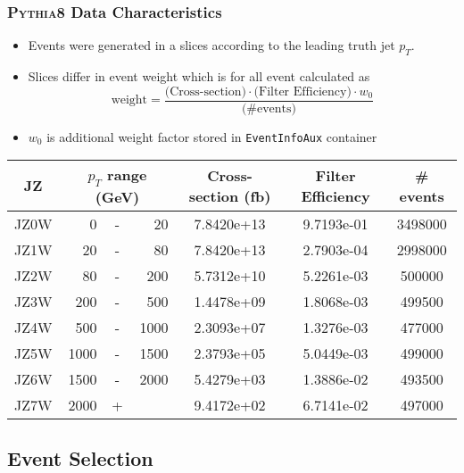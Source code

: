 \documentclass[compress]{beamer}
\newcommand{\pt}{p_{T}}
\begin{document}
\begin{frame}
\frametitle{\textsc{Pythia8} Data Characteristics}
\begin{itemize}
  \item Events were generated in a slices according to the leading truth
      jet $\pt$.
  \item Slices differ in event weight which is for all event calculated as
  \begin{equation*}
    \text{weight} = \frac{\text{(Cross-section)} \cdot \text{(Filter
      Efficiency)} \cdot w_0}{\text{(\# events)}} 
    \end{equation*}
  \item $w_0$ is additional weight factor stored in \texttt{EventInfoAux}
    container
\end{itemize}
  \small
  \begin{table}
  \centering
  \begin{tabular}{|c|rcr|c|c|c|}
    \hline 
     JZ & \multicolumn{3}{|c|}{$\pt$ range (GeV)} & Cross-section (fb) & Filter Efficiency & \# events  \\ 
    \hline
    \hline
		 JZ0W &     0 & - &    20 & 7.8420e+13 & 9.7193e-01 & 3498000 \\ 
    \hline
		 JZ1W &    20 & - &    80 & 7.8420e+13 & 2.7903e-04 & 2998000 \\
    \hline
		 JZ2W &    80 & - &   200 & 5.7312e+10 & 5.2261e-03 & 500000  \\
    \hline
		 JZ3W &   200 & - &   500 & 1.4478e+09 & 1.8068e-03 & 499500  \\
    \hline
		 JZ4W &   500 & - &  1000 & 2.3093e+07 & 1.3276e-03 & 477000  \\
    \hline
		 JZ5W &  1000 & - &  1500 & 2.3793e+05 & 5.0449e-03 & 499000  \\
    \hline
		 JZ6W &  1500 & - &  2000 & 5.4279e+03 & 1.3886e-02 & 493500  \\
    \hline
		 JZ7W &  2000 & + &       & 9.4172e+02 & 6.7141e-02 & 497000  \\
    \hline 
  \end{tabular}
\end{table}
\normalsize
\end{frame}

\subsection{Event Selection}
\end{document}
